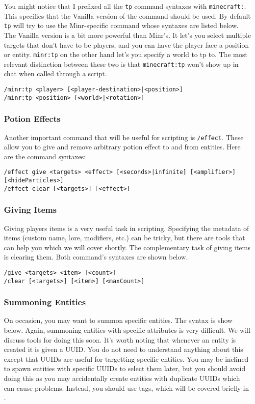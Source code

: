 \documentclass[oneside]{book}
\begin{document}
You might notice that I prefixed all the \texttt{tp} command syntaxes with \texttt{minecraft:}. This specifies that the Vanilla version of the command should be used. By default \texttt{tp} will try to use the Minr-specific command whose syntaxes are listed below. The Vanilla version is a bit more powerful than Minr's. It let's you select multiple targets that don't have to be players, and you can have the player face a position or entity. \texttt{minr:tp} on the other hand let's you specify a world to tp to. The most relevant distinction between these two is that \texttt{minecraft:tp} won't show up in chat when called through a script.

\begin{verbatim}
/minr:tp <player> [<player-destination>|<position>]
/minr:tp <position> [<world>|<rotation>]
\end{verbatim}

\subsubsection*{Potion Effects}
Another important command that will be useful for scripting is \texttt{/effect}. These allow you to give and remove arbitrary potion effect to and from entities. Here are the command syntaxes:

\begin{verbatim}
/effect give <targets> <effect> [<seconds>|infinite] [<amplifier>]
[<hideParticles>]
/effect clear [<targets>] [<effect>]
\end{verbatim}

\subsubsection*{Giving Items}
Giving players items is a very useful task in scripting. Specifying the metadata of items (custom name, lore, modifiers, etc.) can be tricky, but there are tools that can help you which we will cover shortly. The complementary task of giving items is clearing them. Both command's syntaxes are shown below.

\begin{verbatim}
/give <targets> <item> [<count>]
/clear [<targets>] [<item>] [<maxCount>]
\end{verbatim}

\subsubsection*{Summoning Entities}
On occasion, you may want to summon specific entities. The syntax is show below. Again, summoning entities with specific attributes is very difficult. We will discuss tools for doing this soon. It's worth noting that whenever an entity is created it is given a UUID. You do not need to understand anything about this except that UUIDs are useful for targetting specific entities. You may be inclined to spawn entities with specific UUIDs to select them later, but you should avoid doing this as you may accidentally create entities with duplicate UUIDs which can cause problems. Instead, you should use tags, which will be covered briefly in .
\end{document}
